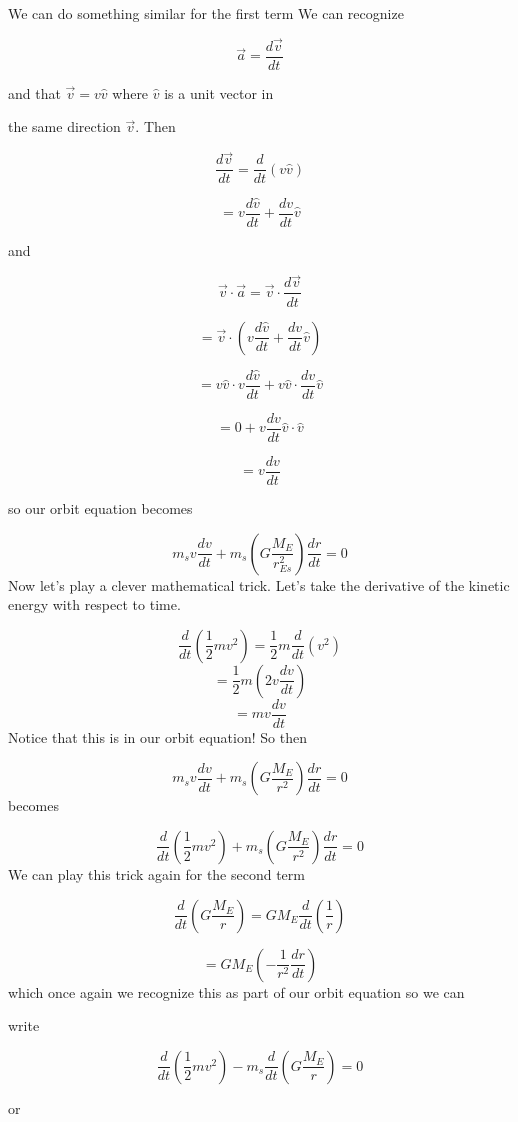 We can do something similar for the first term We can recognize 

$$\overrightarrow{a}=\frac{d\overrightarrow{v}}{dt}$$

and that $\overrightarrow{v}=v\hat{v}$ where $\hat{v}$ is a unit vector in

the same direction $\overrightarrow{v}.$ Then 

$$\frac{d\overrightarrow{v}}{dt}=\frac{d}{dt}\left( v\hat{v}\right) $$

$$=v\frac{d\hat{v}}{dt}+\frac{dv}{dt}\hat{v}$$

and 

$$\overrightarrow{v}\cdot \overrightarrow{a}=\overrightarrow{v}\cdot \frac{d\overrightarrow{v}}{dt}$$

$$=\overrightarrow{v}\cdot \left( v\frac{d\hat{v}}{dt}+\frac{dv}{dt}\hat{v}\right)
$$

$$=v\hat{v}\cdot v\frac{d\hat{v}}{dt}+v\hat{v}\cdot \frac{dv}{dt}\hat{v}$$

$$=0+v\frac{dv}{dt}\hat{v}\cdot \hat{v}$$

$$=v\frac{dv}{dt}$$

so our orbit equation becomes

$$m_{s}v\frac{dv}{dt}+m_{s}\left( G\frac{M_{E}}{r_{Es}^{2}}\right) \frac{dr}{dt}=0
$$
Now let's play a clever mathematical trick. Let's take the derivative of the
kinetic energy with respect to time.

$$\frac{d}{dt}\left( \frac{1}{2}mv^{2}\right) =\frac{1}{2}m\frac{d}{dt}\left(v^{2}\right) 
$$%
$$=\frac{1}{2}m\left( 2v\frac{dv}{dt}\right) 
$$%
$$=mv\frac{dv}{dt}$$%
Notice that this is in our orbit equation! So then%

$$m_{s}v\frac{dv}{dt}+m_{s}\left( G\frac{M_{E}}{r^{2}}\right) \frac{dr}{dt}=0
$$%
becomes 

$$\frac{d}{dt}\left( \frac{1}{2}mv^{2}\right) +m_{s}\left( G\frac{M_{E}}{r^{2}}\right) \frac{dr}{dt}=0$$%
We can play this trick again for the second term%

$$
\frac{d}{dt}\left( G\frac{M_{E}}{r}\right) =GM_{E}\frac{d}{dt}\left( \frac{1}{r}\right) 
$$
	
$$
=GM_{E}\left( -\frac{1}{r^{2}}\frac{dr}{dt}\right) 
$$
which once again we recognize this as part of our orbit equation so we can

write 

$$\frac{d}{dt}\left( \frac{1}{2}mv^{2}\right) -m_{s}\frac{d}{dt}\left( G\frac{M_{E}}{r}\right) =0$$

or 

